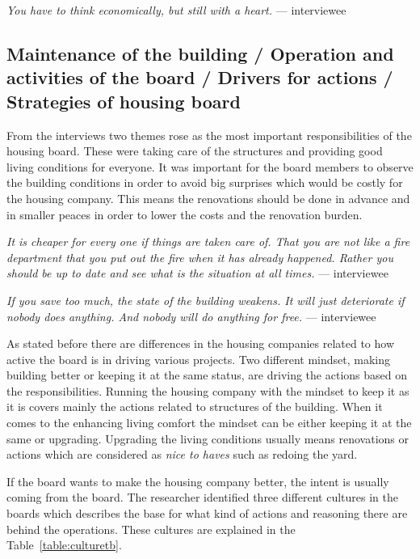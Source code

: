 \begin{displayquote}
\textit{You have to think economically, but still with a heart.} --- interviewee
\end{displayquote}

\subsection{Maintenance of the building / Operation and activities of the board / Drivers for actions / Strategies of housing board}

From the interviews two themes rose as the most important responsibilities of the housing board. These were taking care of the structures and providing good living conditions for everyone. It was important for the board members to observe the building conditions in order to avoid big surprises which would be costly for the housing company. This means the renovations should be done in advance and in smaller peaces in order to lower the costs and the renovation burden.   

\begin{displayquote}
\textit{It is cheaper for every one if things are taken care of. That you are not like a fire department that you put out the fire when it has already happened. Rather you should be up to date and see what is the situation at all times.} --- interviewee
\end{displayquote}

\begin{displayquote}
\textit{If you save too much, the state of the building weakens. It will just deteriorate if nobody does anything. And nobody will do anything for free.} --- interviewee
\end{displayquote}

As stated before there are differences in the housing companies related to how active the board is in driving various projects. Two different mindset, making building better or keeping it at the same status, are driving the actions based on the responsibilities. Running the housing company with the mindset to keep it as it is covers mainly the actions related to structures of the building. When it comes to the enhancing living comfort the mindset can be either keeping it at the same or upgrading. Upgrading the living conditions usually means renovations or actions which are considered as \emph{nice to haves} such as redoing the yard. 

If the board wants to make the housing company better, the intent is usually coming from the board. The researcher identified three different cultures in the boards which describes the base for what kind of actions and reasoning there are behind the operations. These cultures are explained in the Table~\ref{table:culturetb}.

